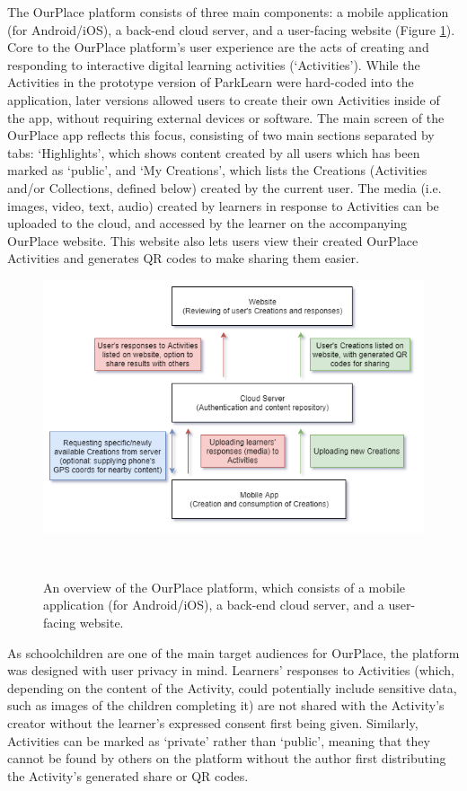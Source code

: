 The OurPlace platform consists of three main components: a mobile application (for Android/iOS), a back-end cloud server, and a user-facing website (Figure \ref{fig:PlatformDiagram}). Core to the OurPlace platform's user experience are the acts of creating and responding to interactive digital learning activities (`Activities'). While the Activities in the prototype version of ParkLearn were hard-coded into the application, later versions allowed users to create their own Activities inside of the app, without requiring external devices or software. The main screen of the OurPlace app reflects this focus, consisting of two main sections separated by tabs: `Highlights', which shows content created by all users which has been marked as `public', and `My Creations', which lists the Creations (Activities and/or Collections, defined below) created by the current user. The media (i.e. images, video, text, audio) created by learners in response to Activities can be uploaded to the cloud, and accessed by the learner on the accompanying OurPlace website. This website also lets users view their created OurPlace Activities and generates QR codes to make sharing them easier.

\begin{figure}
  \centering
  \includegraphics[width=0.9\columnwidth]{images/chapter05/OurPlace_platform.png}
  \caption[Overview of the OurPlace platform]{An overview of the OurPlace platform, which consists of a mobile application (for Android/iOS), a back-end cloud server, and a user-facing website.}~\label{fig:PlatformDiagram}
\end{figure}

As schoolchildren are one of the main target audiences for OurPlace, the platform was designed with user privacy in mind. Learners' responses to Activities (which, depending on the content of the Activity, could potentially include sensitive data, such as images of the children completing it) are not shared with the Activity's creator without the learner's expressed consent first being given.  Similarly, Activities can be marked as `private' rather than `public', meaning that they cannot be found by others on the platform without the author first distributing the Activity's generated share or QR codes. 


